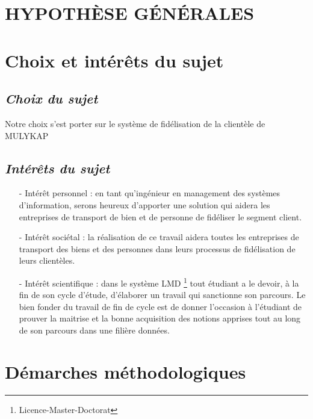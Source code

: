 \documentclass[a4paper,12pt,oneside]{book}
\begin{document}
    \section[Hyposthèses générales]{HYPOTHÈSE GÉNÉRALES}

    \section[Choix et interet du sujet]{Choix et intérêts du sujet}
        \subsection[Choix du sujet]{\textit{Choix du sujet}}
        Notre choix s’est porter sur le système de fidélisation de la clientèle
        de MULYKAP
        \subsection[Interet du sujet]{\textit{Intérêts du sujet}}
            \begin{itemize}
                \item [-] Intérêt personnel : en tant qu’ingénieur en management 
                des systèmes d’information, serons heureux d’apporter une solution
                qui aidera les entreprises de transport de bien et de personne de fidéliser
                le segment client.
                \newline

                \item [-] Intérêt sociétal : la réalisation de ce travail aidera toutes les
                entreprises de transport des biens et des personnes dans leurs processus de
                fidélisation de leurs clientèles.
                \newline

                \item [-] Intérêt scientifique : dans le système LMD \footnote[1]{Licence-Master-Doctorat} tout étudiant
                a le devoir, à la fin de son cycle d’étude, d’élaborer un travail qui
                sanctionne son parcours. Le bien fonder du travail de fin de cycle
                est de donner l’occasion à l’étudiant de prouver la maitrise et la bonne acquisition
                des notions apprises tout au long de son parcours dans une filière données.
            \end{itemize}
    \section[Démarches méthodologiques]{Démarches méthodologiques}
\end{document}
